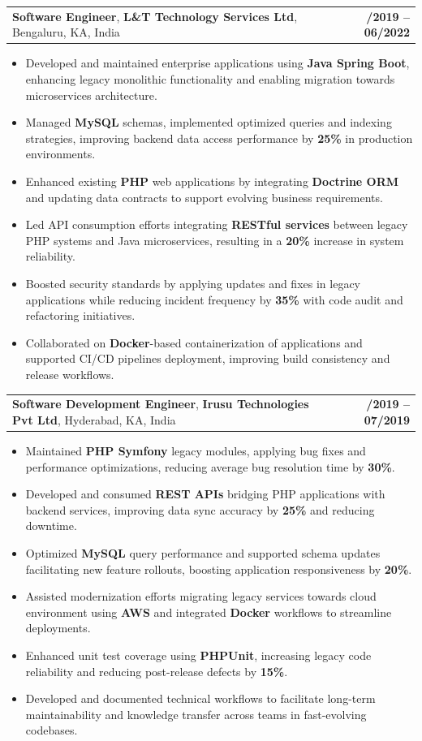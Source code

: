 \documentclass[letterpaper,11pt]{article}
\makeatletter
\newcommand{\resumeItem}[1]{
  \item\footnotesize{
    {#1 \vspace{-2pt}}
  }
}
\newcommand{\resumeSubheading}[4]{
  \vspace{-2pt}\item
    \begin{tabular*}{1.0\textwidth}[t]{l@{\extracolsep{\fill}}r}
      \textbf{\fontsize{10pt}{14pt}\selectfont #3}, \textbf{\fontsize{10pt}{14pt}\selectfont #1}, \fontsize{10pt}{14pt}\selectfont #4 & \textbf{\fontsize{10pt}{14pt}\selectfont #2} \\
    \end{tabular*}\vspace{-7pt}
}
\newcommand{\resumeItemListStart}{\begin{itemize}[leftmargin=*]}
\newcommand{\resumeItemListEnd}{\end{itemize}\vspace{-5pt}}
\makeatother
\begin{document}
    \resumeSubheading
        {L\&T Technology Services Ltd}{08/2019 -- 06/2022}
        {Software Engineer}{Bengaluru, KA, India}
      \resumeItemListStart
        \resumeItem{Developed and maintained enterprise applications using \textbf{Java Spring Boot}, enhancing legacy monolithic functionality and enabling migration towards microservices architecture.}
        \resumeItem{Managed \textbf{MySQL} schemas, implemented optimized queries and indexing strategies, improving backend data access performance by \textbf{25\%} in production environments.}
        \resumeItem{Enhanced existing \textbf{PHP} web applications by integrating \textbf{Doctrine ORM} and updating data contracts to support evolving business requirements.}
        \resumeItem{Led API consumption efforts integrating \textbf{RESTful services} between legacy PHP systems and Java microservices, resulting in a \textbf{20\%} increase in system reliability.}
        \resumeItem{Boosted security standards by applying updates and fixes in legacy applications while reducing incident frequency by \textbf{35\%} with code audit and refactoring initiatives.}
        \resumeItem{Collaborated on \textbf{Docker}-based containerization of applications and supported CI/CD pipelines deployment, improving build consistency and release workflows.}
      \resumeItemListEnd

    \resumeSubheading
        {Irusu Technologies Pvt Ltd}{01/2019 -- 07/2019}
        {Software Development Engineer}{Hyderabad, KA, India}
      \resumeItemListStart
        \resumeItem{Maintained \textbf{PHP Symfony} legacy modules, applying bug fixes and performance optimizations, reducing average bug resolution time by \textbf{30\%}.}
        \resumeItem{Developed and consumed \textbf{REST APIs} bridging PHP applications with backend services, improving data sync accuracy by \textbf{25\%} and reducing downtime.}
        \resumeItem{Optimized \textbf{MySQL} query performance and supported schema updates facilitating new feature rollouts, boosting application responsiveness by \textbf{20\%}.}
        \resumeItem{Assisted modernization efforts migrating legacy services towards cloud environment using \textbf{AWS} and integrated \textbf{Docker} workflows to streamline deployments.}
        \resumeItem{Enhanced unit test coverage using \textbf{PHPUnit}, increasing legacy code reliability and reducing post-release defects by \textbf{15\%}.}
        \resumeItem{Developed and documented technical workflows to facilitate long-term maintainability and knowledge transfer across teams in fast-evolving codebases.}
      \resumeItemListEnd
\end{document}

